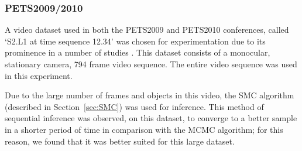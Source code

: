 \documentclass[smallcondensed, final]{svjour3}
\begin{document}





\subsubsection{PETS2009/2010}

A video dataset used in both the PETS2009 and PETS2010 conferences, called `S2.L1 at time sequence 12.34' was chosen for experimentation due to its prominence in a number of studies \cite{ellis_2010}.
This dataset consists of a monocular, stationary camera, 794 frame video sequence. The entire video sequence was used in this experiment. 

Due to the large number of frames and objects in this video, the SMC algorithm (described in Section~\ref{sec:SMC}) was used for inference. This method of sequential inference was observed, on this dataset, to converge to a better sample in a shorter period of time in comparison with the MCMC algorithm; for this reason, we found that it was better suited for this large dataset.
\end{document}
